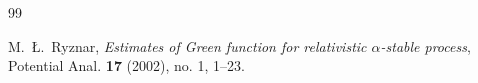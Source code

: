 \documentclass[12pt,a4paper]{article}
\newcommand{\1}{{\bf 1}}
\begin{document}
\begin{thebibliography}{99}
%


%
%



   
%

    {M.~\L.~Ryznar},
    \emph{Estimates of Green function for relativistic $\alpha$-stable process}, 
Potential Anal. {\bf 17} (2002), no. 1, 1--23.

%








\end{thebibliography}
\end{document}
